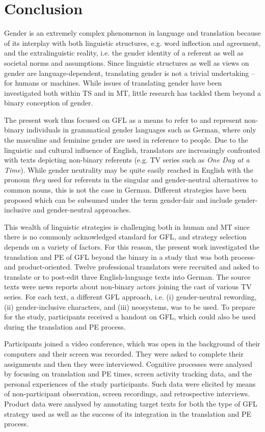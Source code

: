 \chapter{Conclusion} \label{Conclusion}

Gender is an extremely complex phenomenon in language and translation because of its interplay with both linguistic structures, e.g. word inflection and agreement, and the extralinguistic reality, i.e. the gender identity of a referent as well as societal norms and assumptions. Since linguistic structures as well as views on gender are language-dependent, translating gender is not a trivial undertaking -- for humans or machines. While issues of translating gender have been investigated both within TS and in MT, little research has tackled them beyond a binary conception of gender.

The present work thus focused on GFL as a means to refer to and represent non-binary individuals in grammatical gender languages such as German, where only the masculine and feminine gender are used in reference to people. Due to the linguistic and cultural influence of English, translators are increasingly confronted with texts depicting non-binary referents (e.g. TV series such as \textit{One Day at a Time}). While gender neutrality may be quite easily reached in English with the pronoun \textit{they} used for referents in the singular and gender-neutral alternatives to common nouns, this is not the case in German. Different strategies have been proposed which can be subsumed under the term gender-fair and include gender-inclusive and gender-neutral approaches.

This wealth of linguistic strategies is challenging both in human and MT since there is no commonly acknowledged standard for GFL, and strategy selection depends on a variety of factors. For this reason, the present work investigated the translation and PE of GFL beyond the binary in a study that was both process- and product-oriented. Twelve professional translators were recruited and asked to translate or to post-edit three English-language texts into German. The source texts were news reports about non-binary actors joining the cast of various TV series. For each text, a different GFL approach, i.e. (i) gender-neutral rewording, (ii) gender-inclusive characters, and (iii) neosystems, was to be used. To prepare for the study, participants received a handout on GFL, which could also be used during the translation and PE process.

Participants joined a video conference, which was open in the background of their computers and their screen was recorded. They were asked to complete their assignments and then they were interviewed. Cognitive processes were analysed by focusing on translation and PE times, screen activity tracking data, and the personal experiences of the study participants. Such data were elicited by means of non-participant observation, screen recordings, and retrospective interviews. Product data were analysed by annotating target texts for both the type of GFL strategy used as well as the success of its integration in the translation and PE process.


